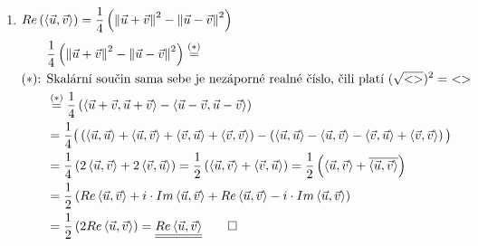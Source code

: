 \documentclass[12pt]{article}
\begin{document}
\begin{enumerate}
  \item $Re\left(\left< \vec{u},\vec{v} \right>\right) = \dfrac{1}{4}\left( \left\lVert\vec{u}+\vec{v}\right\rVert^2 - \left\lVert\vec{u}-\vec{v}\right\rVert^2 \right)$
    \medskip
    \begin{align*}
      &\dfrac{1}{4}\left( \left\lVert\vec{u}+\vec{v}\right\rVert^2 - \left\lVert\vec{u}-\vec{v}\right\rVert^2 \right) \overset{(*)}{=} \\
      (*) \text{: } &\text{Skalární součin sama sebe je nezáporné realné číslo, čili platí } (\sqrt{<>})^2 =\ <> \\
      &\overset{(*)}{=} \dfrac{1}{4}\left( \left<\vec{u}+\vec{v},\vec{u}+\vec{v}\right> - \left<\vec{u}-\vec{v},\vec{u}-\vec{v}\right> \right) \\
      &= \dfrac{1}{4}\big( 
        \left(
          \left<\vec{u},\vec{u}\right>+
          \left<\vec{u},\vec{v}\right>+
          \left<\vec{v},\vec{u}\right>+
          \left<\vec{v},\vec{v}\right>
        \right)
        - \left(
          \left<\vec{u},\vec{u}\right>
          -\left<\vec{u},\vec{v}\right>
          -\left<\vec{v},\vec{u}\right>+
          \left<\vec{v},\vec{v}\right>
        \right)
      \big) \\
      & = \dfrac{1}{4}\left( 2\left<\vec{u},\vec{v}\right> + 2\left<\vec{v},\vec{u}\right> \right) = 
      \dfrac{1}{2}\left( \left<\vec{u},\vec{v}\right> + \left<\vec{v},\vec{u}\right> \right)
      = \dfrac{1}{2}\left( \left<\vec{u},\vec{v}\right> + \overline{\left<\vec{u},\vec{v}\right>} \right) \\
      &= \dfrac{1}{2}\left( Re\left<\vec{u},\vec{v}\right> + i \cdot Im\left<\vec{u},\vec{v}\right>+ Re\left<\vec{u},\vec{v}\right> - i \cdot Im\left<\vec{u},\vec{v}\right> \right) \\
      &= \dfrac{1}{2}\left( 2Re\left<\vec{u},\vec{v}\right> \right) = \underline{\underline{Re\left<\vec{u},\vec{v}\right>}} \quad \quad \square
    \end{align*}
  

\end{enumerate}
\end{document}
